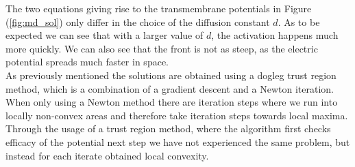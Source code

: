 \documentclass[../draft_1.tex]{subfiles}
\begin{document}
The two equations giving rise to the transmembrane potentials in Figure (\ref{fig:md_sol}) only differ in the choice of the diffusion constant $d$. As to be expected we can see that with a larger value of $d$, the activation happens much more quickly. We can also see that the front is not as steep, as the electric potential spreads much faster in space.
\smallskip
\\
As previously mentioned the solutions are obtained using a dogleg trust region method, which is a combination of a gradient descent and a Newton iteration. When only using a Newton method there are iteration steps where we run into locally non-convex areas and therefore take iteration steps towards local maxima. Through the usage of a trust region method, where the algorithm first checks efficacy of the potential next step we have not experienced the same problem, but instead for each iterate obtained local convexity. 




\end{document}
